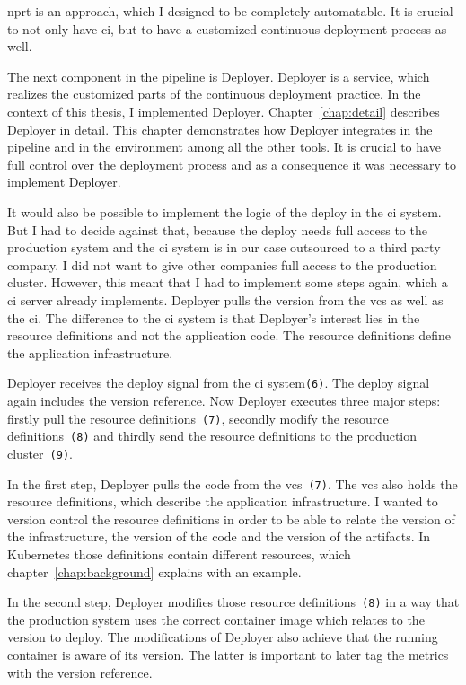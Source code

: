 \gls{nprt} is an approach, which I designed to be completely automatable. It is crucial to
not only have \gls{ci}, but to have a customized continuous deployment process as well.

The next component in the pipeline is Deployer. Deployer is a service, which realizes the
customized parts of the continuous deployment practice. In the context of this thesis, I
implemented Deployer. Chapter~\ref{chap:detail} describes Deployer in detail. This chapter
demonstrates how Deployer integrates in the pipeline and in the environment among all the
other tools. It is crucial to have full control over the deployment process and as a
consequence it was necessary to implement Deployer.

It would also be possible to implement the logic of the deploy in the \gls{ci} system. But
I had to decide against that, because the deploy needs full access to the production
system and the \gls{ci} system is in our case outsourced to a third party company. I did
not want to give other companies full access to the production cluster. However, this
meant that I had to implement some steps again, which a \gls{ci} server already
implements. Deployer pulls the version from the \gls{vcs} as well as the \gls{ci}. The
difference to the \gls{ci} system is that Deployer's interest lies in the resource
definitions and not the application code. The resource definitions define the application
infrastructure.

Deployer receives the deploy signal from the \gls{ci} system\texttt{(6)}. The deploy
signal again includes the version reference. Now Deployer executes three major steps:
firstly pull the resource definitions~\texttt{(7)}, secondly modify the resource
definitions~\texttt{(8)} and thirdly send the resource definitions to the production
cluster~\texttt{(9)}.

In the first step, Deployer pulls the code from the \gls{vcs}~\texttt{(7)}. The \gls{vcs}
also holds the resource definitions, which describe the application infrastructure. I
wanted to version control the resource definitions in order to be able to relate the
version of the infrastructure, the version of the code and the version of the
artifacts. In Kubernetes those definitions contain different resources, which
chapter~\ref{chap:background} explains with an example.

In the second step, Deployer modifies those resource definitions~\texttt{(8)} in a way
that the production system uses the correct container image which relates to the version
to deploy. The modifications of Deployer also achieve that the running container is aware
of its version. The latter is important to later tag the metrics with the version
reference.

